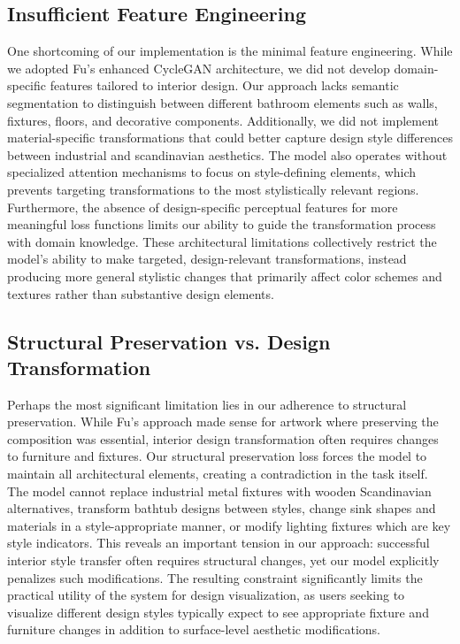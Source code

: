 \documentclass[twocolumn,superscriptaddress,aps]{revtex4-1}
\begin{document}
\subsection{Insufficient Feature Engineering}

One shortcoming of our implementation is the minimal feature engineering. While we adopted Fu's enhanced CycleGAN architecture, we did not develop domain-specific features tailored to interior design. Our approach lacks semantic segmentation to distinguish between different bathroom elements such as walls, fixtures, floors, and decorative components. Additionally, we did not implement material-specific transformations that could better capture design style differences between industrial and scandinavian aesthetics. The model also operates without specialized attention mechanisms to focus on style-defining elements, which prevents targeting transformations to the most stylistically relevant regions. Furthermore, the absence of design-specific perceptual features for more meaningful loss functions limits our ability to guide the transformation process with domain knowledge. These architectural limitations collectively restrict the model's ability to make targeted, design-relevant transformations, instead producing more general stylistic changes that primarily affect color schemes and textures rather than substantive design elements.

\subsection{Structural Preservation vs. Design Transformation}

Perhaps the most significant limitation lies in our adherence to structural preservation. While Fu's approach made sense for artwork where preserving the composition was essential, interior design transformation often requires changes to furniture and fixtures. Our structural preservation loss forces the model to maintain all architectural elements, creating a contradiction in the task itself. The model cannot replace industrial metal fixtures with wooden Scandinavian alternatives, transform bathtub designs between styles, change sink shapes and materials in a style-appropriate manner, or modify lighting fixtures which are key style indicators. This reveals an important tension in our approach: successful interior style transfer often requires structural changes, yet our model explicitly penalizes such modifications. The resulting constraint significantly limits the practical utility of the system for design visualization, as users seeking to visualize different design styles typically expect to see appropriate fixture and furniture changes in addition to surface-level aesthetic modifications.
\end{document}
